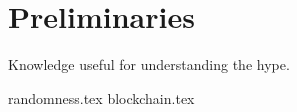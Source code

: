 \section{Preliminaries}\label{sec:preliminaries}
Knowledge useful for understanding the hype.

{randomness.tex}
{blockchain.tex}

